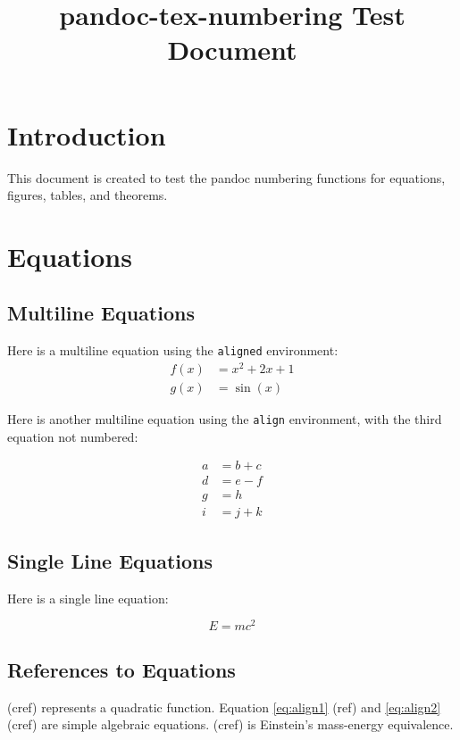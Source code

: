 \documentclass{article}
\title{pandoc-tex-numbering Test Document}
\begin{document}
\maketitle

\section{Introduction}
This document is created to test the pandoc numbering functions for equations, figures, tables, and theorems.

\section{Equations}

\subsection{Multiline Equations\label{sec:equations}}
Here is a multiline equation using the \texttt{aligned} environment:
\begin{equation}
    \begin{aligned}
        f(x) &= x^2 + 2x + 1 \\
        g(x) &= \sin(x)
    \end{aligned}
    \label{eq:quadratic}
\end{equation}

Here is another multiline equation using the \texttt{align} environment, with the third equation not numbered:

\begin{align}
    a &= b + c \label{eq:align1} \\
    d &= e - f \label{eq:align2} \\
    g &= h \nonumber \\
    i &= j + k \label{eq:align3}
\end{align}

\subsection{Single Line Equations}
Here is a single line equation:

\begin{equation}
    E = mc^2 \label{eq:einstein}
\end{equation}

\subsection{References to Equations}
 (cref) represents a quadratic function. Equation \ref{eq:align1} (ref) and \cref{eq:align2} (cref) are simple algebraic equations.  (cref) is Einstein's mass-energy equivalence. 
\end{document}
